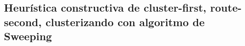 \subsection{Heurística constructiva de cluster-first, route-second, clusterizando con algoritmo de Sweeping}